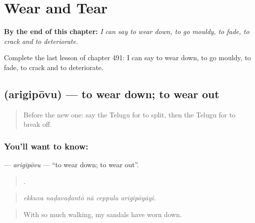 
\chapter{Wear and Tear}
\label{ch:te-wear-and-tear}

\begin{chapteropening}
\textbf{By the end of this chapter:} \emph{I can say to wear down, to go mouldy, to fade, to crack and to deteriorate.}

Complete the last lesson of chapter 491: I can say to wear down, to go mouldy, to fade, to crack and to deteriorate.
\end{chapteropening}

\section[\texorpdfstring{\te{అరిగిపోవు} (arigipōvu)}{అరిగిపోవు (arigipōvu)}]{ (arigipōvu) — to wear down; to wear out}

\label{lesson:TE-C491-arigipovu}



\begin{quote}
Before the new one: say the Telugu for to split, then the Telugu for to break off.
\end{quote}

\subsection*{You'll want to know: }
\textbf{} — \emph{arigipōvu} — \textquotedblleft{}to wear down; to wear out\textquotedblright{}.

\begin{quote}
    .
\end{quote}

\begin{quote}
\emph{ekkuva naḍavaḍantō nā ceppulu arigipōyāyi.}
\end{quote}

\begin{quote}
With so much walking, my sandals have worn down.
\end{quote}

